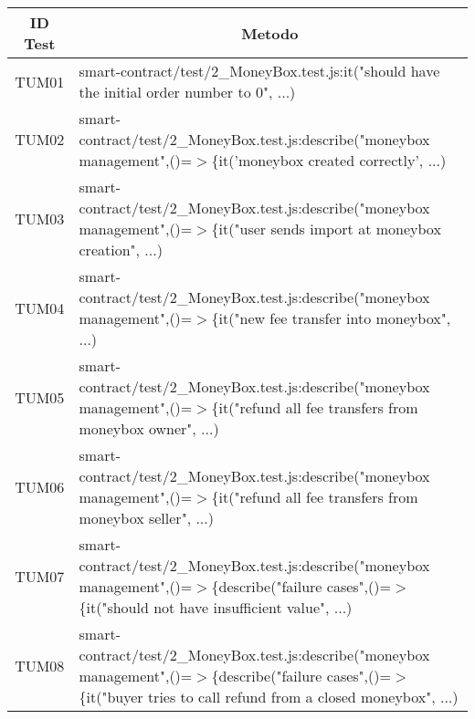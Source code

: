 \begin{table}[H]
  \centering
  \renewcommand{\arraystretch}{1.8}
  \begin{tabular}{c|p{15cm}}
    \rowcolor[HTML]{125E28}
    \color[HTML]{FFFFFF}\textbf{ID Test}
          & \multicolumn{1}{c}{\color[HTML]{FFFFFF}\textbf{Metodo}}                                                                                                                              \\
    \hline
    TUM01 & smart-contract/test/2\_MoneyBox.test.js:it("should have the initial order number to 0", ...)                                                                                         \\
    TUM02 & smart-contract/test/2\_MoneyBox.test.js:describe("moneybox management",\newline()=$>$\{it('moneybox created correctly', ...)                                                         \\
    TUM03 & smart-contract/test/2\_MoneyBox.test.js:describe("moneybox management",\newline()=$>$\{it("user sends import at moneybox creation", ...)                                             \\
    TUM04 & smart-contract/test/2\_MoneyBox.test.js:describe("moneybox management",\newline()=$>$\{it("new fee transfer into moneybox", ...)                                                     \\
    TUM05 & smart-contract/test/2\_MoneyBox.test.js:describe("moneybox management",\newline()=$>$\{it("refund all fee transfers from moneybox owner", ...)                                       \\
    TUM06 & smart-contract/test/2\_MoneyBox.test.js:describe("moneybox management",\newline()=$>$\{it("refund all fee transfers from moneybox seller", ...)                                      \\
    TUM07 & smart-contract/test/2\_MoneyBox.test.js:describe("moneybox management",\newline()=$>$\{describe("failure cases",()=$>$\{it("should not have insufficient value", ...)                \\
    TUM08 & smart-contract/test/2\_MoneyBox.test.js:describe("moneybox management",\newline()=$>$\{describe("failure cases",()=$>$\{it("buyer tries to call refund from a closed moneybox", ...) \\

\end{tabular}
\end{table}
